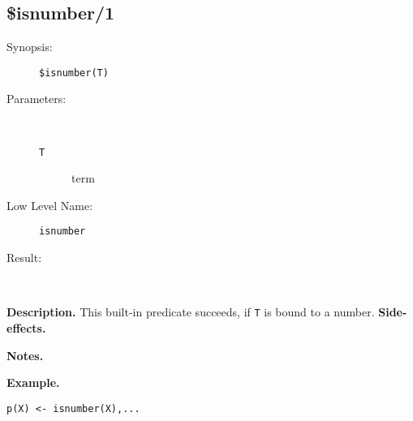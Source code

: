 %
%
%
\subsection{\$isnumber/1}

\begin{description}
\item[Synopsis:]
	{\tt \$isnumber(T)}
\item[Parameters:]\ \\[-0.5cm]
	\begin{description}
	\item[{\tt T}] term
	\end{description}
\item[Low Level Name:]
	{\tt isnumber}
\item[Result:]\ \\
\end{description}

\vspace*{0.5cm}
\noindent
{\bf Description.}
This built-in predicate succeeds, if {\tt T} is
bound to a number.
\vspace*{0.5cm}
\noindent
{\bf Side-effects.}

\vspace*{0.5cm}
\noindent
{\bf Notes.}

\vspace*{0.5cm}
\noindent
{\bf Example.}
\begin{verbatim}
p(X) <- isnumber(X),...
\end{verbatim}


